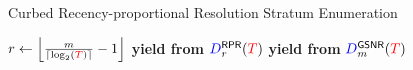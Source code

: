 \begin{algorithm}
\caption{Curbed Recency-proportional Resolution Stratum Enumeration}
\label{alg:curbed-recency-proportional-algo-enum-retained-ranks}
\begin{algorithmic}[1]
\Ensure{ $\colorTbar \in [0 \twodots \colorT)$ -- data items to drop, if any }    
\State $r \gets \left\lfloor \frac{m}{\left\lceil \log_2(\colorT) \right\rceil} - 1 \right\rfloor$
  \State \textbf{yield from} $\colorD^{\mathsf{RPR}}_r(\colorT)$
\Else
  \State \textbf{yield from} $\colorD^{\mathsf{GSNR}}_m(\colorT)$
\EndIf
\end{algorithmic}
\end{algorithm}
